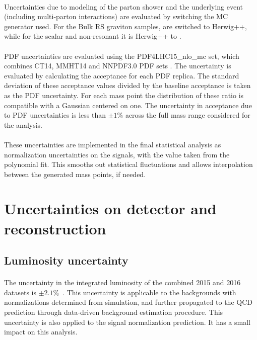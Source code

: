 \paragraph{}
Uncertainties due to modeling of the parton shower and the underlying event (including multi-parton interactions) are evaluated by switching the MC generator used. For the Bulk RS graviton samples,  are switched to Herwig++, while for the scalar and non-resonant it is Herwig++ to .

\paragraph{}
PDF uncertainties are evaluated using the PDF4LHC15\_nlo\_mc set, which combines CT14, MMHT14 and NNPDF3.0 PDF sets \cite{0954-3899-43-2-023001}. 
The uncertainty is evaluated by calculating the acceptance for each PDF replica. 
The standard deviation of these acceptance values divided by the baseline acceptance is taken as the PDF uncertainty. 
For each mass point the distribution of these ratio is compatible with a Gaussian centered on one.
The uncertainty in acceptance due to PDF uncertainties is less than $\pm1\%$ across the full mass range considered for the analysis.

\paragraph{}
These uncertainties are implemented in the final statistical analysis as normalization uncertainties on the signals, with the value taken from the polynomial fit. 
This smooths out statistical fluctuations and allows interpolation between the generated mass points, if needed.


\section{Uncertainties on detector and reconstruction}

\subsection{Luminosity uncertainty} 
\paragraph{}
The uncertainty in the integrated luminosity of the combined 2015 and 2016 datasets is $\pm2.1$\%~\cite{LumiCiteUP}.
This uncertainty is applicable to the backgrounds with normalizations determined from simulation, and further propagated to the QCD prediction through data-driven background estimation procedure.
This uncertainty is also applied to the signal normalization prediction.
It has a small impact on this analysis. 

